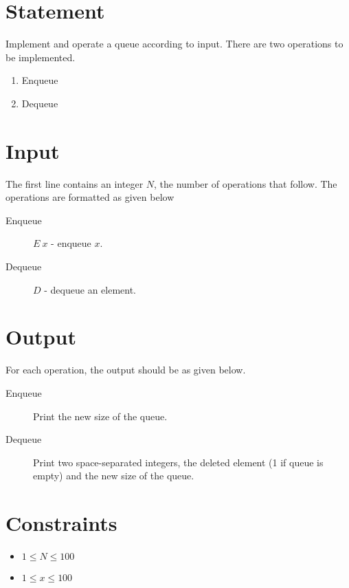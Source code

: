 \documentclass{article}
\begin{document}
\section*{Statement}

Implement and operate a queue according to input. There are two operations to be implemented.

\begin{enumerate}
    \item Enqueue
    \item Dequeue
\end{enumerate}

\section*{Input}

The first line contains an integer $N$, the number of operations that follow. The operations are formatted as given below

\begin{description}
    \item[Enqueue] $E\ x$ - enqueue $x$.
    \item[Dequeue] $D$ - dequeue an element.
\end{description}

\section*{Output}

For each operation, the output should be as given below.

\begin{description}
    \item[Enqueue] Print the new size of the queue.
    \item[Dequeue] Print two space-separated integers, the deleted element (1 if queue is empty) and the new size of the queue.
\end{description}

\section*{Constraints}

\begin{itemize}
    \item $1 \le N \le 100$
    \item $1 \le x \le 100$
\end{itemize}
\end{document}
